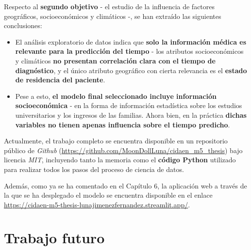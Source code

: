 Respecto al \textbf{segundo objetivo} - el estudio de la influencia de factores geográficos, socioeconómicos y climáticos -, se han extraído las siguientes conclusiones:
\begin{itemize}
	\item El análisis exploratorio de datos indica que \textbf{solo la información médica es relevante para la predicción del tiempo} - los atributos socioeconómicos y climáticos \textbf{no presentan correlación clara con el tiempo de diagnóstico}, y el único atributo geográfico con cierta relevancia es el \textbf{estado de residencia del paciente}.
	\item Pese a esto, \textbf{el modelo final seleccionado incluye información socioeconómica} - en la forma de información estadística sobre los estudios universitarios y los ingresos de las familias. Ahora bien, en la práctica \textbf{dichas variables no tienen apenas influencia sobre el tiempo predicho}.
\end{itemize}

Actualmente, el trabajo completo se encuentra disponible en un repositorio público de \textit{Github} (\url{https://github.com/MoonDollLuna/cidaen_m5_thesis}) bajo licencia \textit{MIT}, incluyendo tanto la memoria como el \textbf{código Python} utilizado para realizar todos los pasos del proceso de ciencia de datos.

Además, como ya se ha comentado en el Capítulo 6, la aplicación web a través de la que se ha desplegado el modelo se encuentra disponible en el enlace \url{https://cidaen-m5-thesis-lunajimenezfernandez.streamlit.app/}.


\section{Trabajo futuro}

